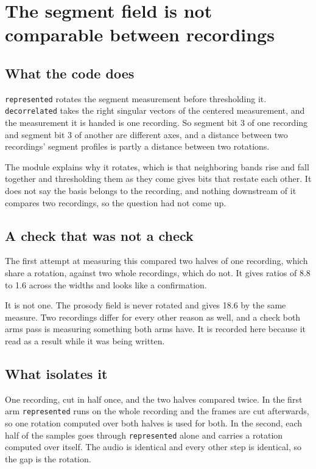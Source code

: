 \section{The segment field is not comparable between recordings}

\subsection{What the code does}

\texttt{represented} rotates the segment measurement before thresholding it.
\texttt{decorrelated} takes the right singular vectors of the centered measurement, and the
measurement it is handed is one recording. So segment bit 3 of one recording and segment bit 3 of
another are different axes, and a distance between two recordings' segment profiles is partly a
distance between two rotations.

The module explains why it rotates, which is that neighboring bands rise and fall together and
thresholding them as they come gives bits that restate each other. It does not say the basis belongs
to the recording, and nothing downstream of it compares two recordings, so the question had not come
up.

\subsection{A check that was not a check}

The first attempt at measuring this compared two halves of one recording, which share a rotation,
against two whole recordings, which do not. It gives ratios of 8.8 to 1.6 across the widths and
looks like a confirmation.

It is not one. The prosody field is never rotated and gives 18.6 by the same measure. Two recordings
differ for every other reason as well, and a check both arms pass is measuring something both arms
have. It is recorded here because it read as a result while it was being written.

\subsection{What isolates it}

One recording, cut in half once, and the two halves compared twice. In the first arm
\texttt{represented} runs on the whole recording and the frames are cut afterwards, so one rotation
computed over both halves is used for both. In the second, each half of the samples goes through
\texttt{represented} alone and carries a rotation computed over itself. The audio is identical and
every other step is identical, so the gap is the rotation.

